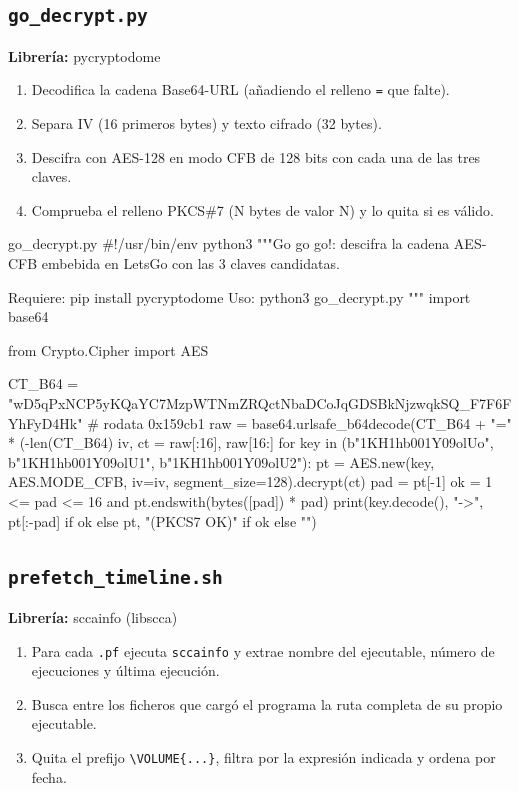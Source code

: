 \documentclass[11pt,a4paper]{article}
\begin{document}
\subsection{\texttt{go\_decrypt.py}}
\textbf{Librería:} pycryptodome
\begin{enumerate}

\item Decodifica la cadena Base64-URL (añadiendo el relleno \texttt{=} que falte).

\item Separa IV (16 primeros bytes) y texto cifrado (32 bytes).

\item Descifra con AES-128 en modo CFB de 128 bits con cada una de las tres claves.

\item Comprueba el relleno PKCS\#7 (N bytes de valor N) y lo quita si es válido.

\end{enumerate}

\begin{codigopython}{go\_decrypt.py}
#!/usr/bin/env python3
"""Go go go!: descifra la cadena AES-CFB embebida en LetsGo con las 3 claves candidatas.

Requiere: pip install pycryptodome
Uso: python3 go_decrypt.py
"""
import base64

from Crypto.Cipher import AES

CT_B64 = "wD5qPxNCP5yKQaYC7MzpWTNmZRQctNbaDCoJqGDSBkNjzwqkSQ_F7F6FYhFyD4Hk"  # rodata 0x159cb1
raw = base64.urlsafe_b64decode(CT_B64 + "=" * (-len(CT_B64) %
iv, ct = raw[:16], raw[16:]
for key in (b"1KH1hb001Y09olUo", b"1KH1hb001Y09olU1", b"1KH1hb001Y09olU2"):
    pt = AES.new(key, AES.MODE_CFB, iv=iv, segment_size=128).decrypt(ct)
    pad = pt[-1]
    ok = 1 <= pad <= 16 and pt.endswith(bytes([pad]) * pad)
    print(key.decode(), "->", pt[:-pad] if ok else pt, "(PKCS7 OK)" if ok else "")
\end{codigopython}

\subsection{\texttt{prefetch\_timeline.sh}}
\textbf{Librería:} sccainfo (libscca)
\begin{enumerate}

\item Para cada \texttt{.pf} ejecuta \texttt{sccainfo} y extrae nombre del ejecutable, número de ejecuciones y última ejecución.

\item Busca entre los ficheros que cargó el programa la ruta completa de su propio ejecutable.

\item Quita el prefijo \texttt{\textbackslash{}VOLUME\{...\}}, filtra por la expresión indicada y ordena por fecha.

\end{enumerate}
\end{document}
